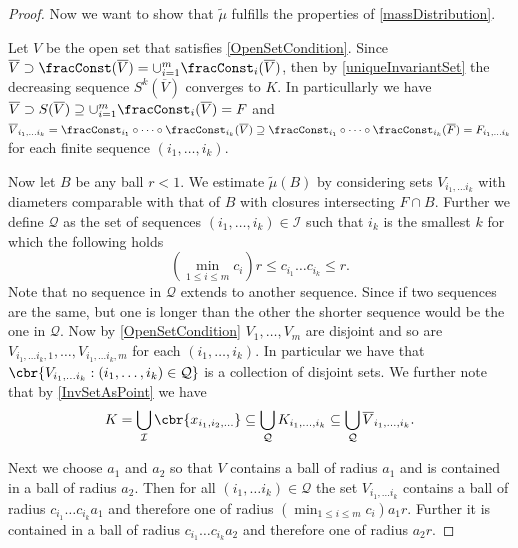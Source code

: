 \begin{proof}
	Now we want to show that $\tilde{\mu}$ fulfills the properties of \cref{massDistribution}. 
	
	Let $V$ be the open set that satisfies \cref{OpenSetCondition}.  Since $\overline{V} \supset \fracConst(\overline{V}) = \cup_{i = 1}^{m} \fracConst_{i}(\overline{V})$, then by \cref{uniqueInvariantSet} the decreasing sequence $S^{k}(\overline{V})$ converges to $K$. In particullarly we have $\overline{V} \supset S(\overline{V}) \supseteq \cup_{i = 1}^{m} \fracConst_i(\overline{V}) = F$ and $\overline{V}_{i_1, \ldots i_k} =\fracConst_{i_1} \circ \dots \circ \fracConst_{i_k}(\overline{V}) \supseteq \fracConst_{i_1} \circ \dots \circ \fracConst_{i_k}(\overline{F}) = F_{i_1, \ldots i_k}$ for each finite sequence $(i_1, \ldots, i_k)$. 
	
	Now let $B$ be any ball $r < 1$. We estimate $\tilde{\mu}(B)$ by considering sets $V_{i_1, \ldots i_k}$ with diameters comparable with that of $B$ with closures intersecting $F \cap B$. Further we define $\mathcal{Q}$ as the set of sequences $(i_1, \ldots, i_k) \in \mathcal{I}$ such that $i_k$ is the smallest $k$ for which the following holds
	\begin{equation}
		\left(\min_{1 \leq i \leq m} c_i\right) r \leq c_{i_1} \dots c_{i_k} \leq r.
	\end{equation}
	Note that no sequence in $\mathcal{Q}$ extends to another sequence. Since if two sequences are the same, but one is longer than the other the shorter sequence would be the one in $\mathcal{Q}$.  Now by \cref{OpenSetCondition} $V_1, \ldots, V_m$ are disjoint and so are $V_{i_1, \ldots i_k, 1}, \ldots, V_{i_1, \ldots i_k, m}$ for each $(i_1, \ldots, i_k)$. In particular we have that $\cbr{V_{i_1, \ldots i_k} : (i_1, \ldots, i_k) \in \mathcal{Q}}$ is a collection of disjoint sets. We further note that by \eqref{InvSetAsPoint} we have
	\begin{equation}\label{KasCompactV}
		K = \bigcup_{\mathcal{I}} \cbr{x_{i_1, i_2, \ldots}} \subseteq \bigcup_{\mathcal{Q}} K_{i_1, \ldots, i_k} \subseteq \bigcup_{\mathcal{Q}} \overline{V}_{i_1, \ldots, i_k}.
	\end{equation}
	
	Next we choose $a_1$ and $a_2$ so that $V$ contains a ball of radius $a_1$ and is contained in a ball of radius $a_2$. Then for all $(i_1, \ldots i_k) \in \mathcal{Q}$ the set $V_{i_1, \ldots i_k}$ contains a ball of radius $c_{i_1} \dots c_{i_k} a_1$ and therefore one of radius $\left(\min_{1 \leq i \leq m} c_i\right) a_1 r$. Further it is contained in a ball of radius $c_{i_1} \dots c_{i_k} a_2$ and therefore one of radius $a_2 r$.
	

\end{proof}
